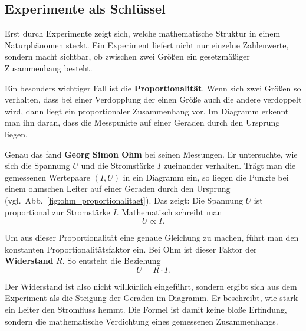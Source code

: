 \subsection{Experimente als Schlüssel}

Erst durch Experimente zeigt sich, welche mathematische Struktur in einem Naturphänomen steckt.
Ein Experiment liefert nicht nur einzelne Zahlenwerte,
sondern macht sichtbar, ob zwischen zwei Größen ein gesetzmäßiger Zusammenhang besteht.

Ein besonders wichtiger Fall ist die \textbf{Proportionalität}.
Wenn sich zwei Größen so verhalten, dass bei einer Verdopplung der einen Größe
auch die andere verdoppelt wird,
dann liegt ein proportionaler Zusammenhang vor.
Im Diagramm erkennt man ihn daran,
dass die Messpunkte auf einer Geraden durch den Ursprung liegen.

Genau das fand \textbf{Georg Simon Ohm} bei seinen Messungen.
Er untersuchte, wie sich die Spannung $U$ und die Stromstärke $I$ zueinander verhalten.
Trägt man die gemessenen Wertepaare $(I,U)$ in ein Diagramm ein,
so liegen die Punkte bei einem ohmschen Leiter auf einer Geraden durch den Ursprung
(vgl.\ Abb.~\ref{fig:ohm_proportionalitaet}).
Das zeigt:
Die Spannung $U$ ist proportional zur Stromstärke $I$.
Mathematisch schreibt man
\[
U \propto I.
\]

Um aus dieser Proportionalität eine genaue Gleichung zu machen,
führt man den konstanten Proportionalitätsfaktor ein.
Bei Ohm ist dieser Faktor der \textbf{Widerstand} $R$.
So entsteht die Beziehung
\[
U = R \cdot I.
\]

Der Widerstand ist also nicht willkürlich eingeführt,
sondern ergibt sich aus dem Experiment als die Steigung der Geraden im Diagramm.
Er beschreibt, wie stark ein Leiter den Stromfluss hemmt.
Die Formel ist damit keine bloße Erfindung,
sondern die mathematische Verdichtung eines gemessenen Zusammenhangs.

